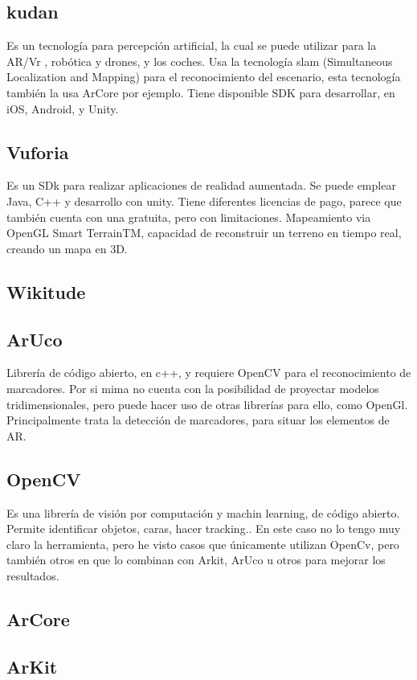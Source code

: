 \subsection{kudan}
Es un tecnología para percepción artificial, la cual se puede utilizar para la AR/Vr , robótica y drones, y los coches.
Usa la tecnología slam (Simultaneous Localization and Mapping) para el reconocimiento del escenario, esta tecnología también la usa ArCore por ejemplo.
Tiene disponible SDK para desarrollar, en iOS, Android, y Unity.

\subsection{Vuforia}
Es un SDk para realizar aplicaciones de realidad aumentada. Se puede emplear Java, C++ y desarrollo con unity. Tiene diferentes licencias de pago, parece que también cuenta con una gratuita, pero con limitaciones.
Mapeamiento via OpenGL
Smart TerrainTM, capacidad de reconstruir un terreno en tiempo real, creando un mapa en 3D.

\subsection{Wikitude}


\subsection{ArUco}
Librería de código abierto, en c++, y requiere OpenCV para el reconocimiento de marcadores.
Por si mima no cuenta con la posibilidad de proyectar modelos tridimensionales, pero puede hacer uso de otras librerías para ello, como OpenGl.
Principalmente trata la detección de marcadores, para situar los elementos de AR.

\subsection{OpenCV}
Es una librería de visión por computación y machin learning, de código abierto. Permite identificar objetos, caras, hacer tracking..
En este caso no lo tengo muy claro la herramienta, pero he visto casos que únicamente utilizan OpenCv, pero también otros en que lo combinan con Arkit, ArUco u otros para mejorar los resultados.

\subsection{ArCore}
\subsection{ArKit}

